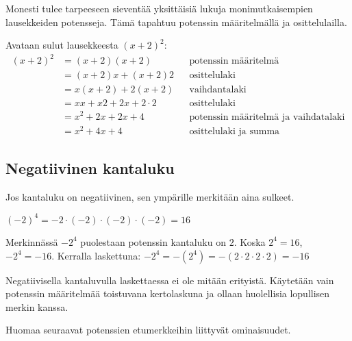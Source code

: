 Monesti tulee tarpeeseen sieventää yksittäisiä lukuja monimutkaisempien lausekkeiden potensseja. Tämä tapahtuu potenssin määritelmällä ja osittelulailla.
\begin{esimerkki}
 Avataan sulut lausekkeesta $(x+2)^2$:
	\begin{align*}
	(x+2)^2
	&=(x+2)(x+2) && \text{potenssin määritelmä} \\
	&=(x+2)x+(x+2)2 && \text{osittelulaki} \\
	&=x(x+2)+2(x+2) && \text{vaihdantalaki} \\
	&=xx+x2+2x+2\cdot2 && \text{osittelulaki} \\
	&=x^2+2x+2x+4 && \text{potenssin määritelmä ja vaihdatalaki} \\
	&=x^2+4x+4 && \text{osittelulaki ja summa}
	\end{align*}
\end{esimerkki} %


\subsection{Negatiivinen kantaluku}

Jos kantaluku on negatiivinen, sen ympärille merkitään aina sulkeet.

\begin{esimerkki}
$(-2)^4 = -2 \cdot (-2)\cdot(-2)\cdot(-2) = 16$

Merkinnässä $-2^4$ puolestaan potenssin kantaluku on $2$. Koska $2^4 = 16$, $-2^4=-16$. Kerralla laskettuna: $-2^4 =-(2^4)= -(2 \cdot 2\cdot 2 \cdot 2) = -16$
\end{esimerkki}

Negatiivisella kantaluvulla laskettaessa ei ole mitään erityistä. Käytetään vain potenssin määritelmää toistuvana kertolaskuna ja ollaan huolellisia lopullisen merkin kanssa.
 
\begin{esimerkki}
\end{esimerkki}
    
Huomaa seuraavat potenssien etumerkkeihin liittyvät ominaisuudet.


